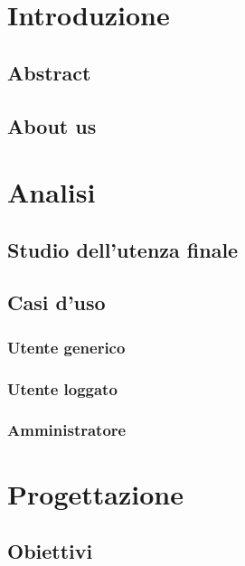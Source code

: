 \documentclass[a4paper, oneside, openany, dvipsnames, table]{article}
\begin{document}
\copertina
\tableofcontents
\newpage
\section{Introduzione}
	\subsection{Abstract}
		
	\subsection{About us}
		
	
\newpage
\section{Analisi}
	
	\subsection{Studio dell'utenza finale}
		
	\subsection{Casi d'uso}
		
		\subsubsection{Utente generico}
			
		\subsubsection{Utente loggato}
			
		\subsubsection{Amministratore}
			

\newpage
\section{Progettazione}
	
	\subsection{Obiettivi}
		
\end{document}
